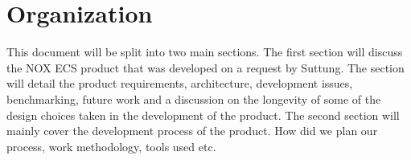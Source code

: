 \section{Organization}
This document will be split into two main sections.
The first section will discuss the NOX ECS product that was developed
on a request by Suttung.
The section will detail the product requirements, architecture,
development issues, benchmarking, future work and a discussion on the longevity
of some of the design choices taken in the development of the product.
The second section will mainly cover the development process of the product.
How did we plan our process, work methodology, tools used etc.
